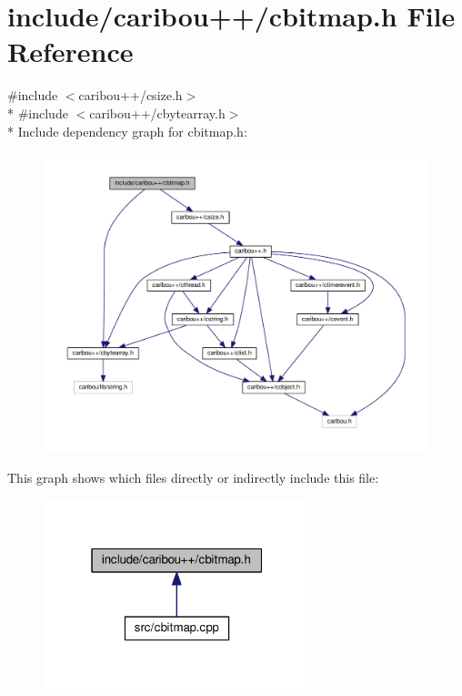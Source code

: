 \section{include/caribou++/cbitmap.h File Reference}
\label{cbitmap_8h}
{\ttfamily \#include $<$caribou++/csize.\-h$>$}\\*
{\ttfamily \#include $<$caribou++/cbytearray.\-h$>$}\\*
Include dependency graph for cbitmap.\-h\-:\nopagebreak
\begin{figure}[H]
\begin{center}
\leavevmode
\includegraphics[width=350pt]{cbitmap_8h__incl}
\end{center}
\end{figure}
This graph shows which files directly or indirectly include this file\-:\nopagebreak
\begin{figure}[H]
\begin{center}
\leavevmode
\includegraphics[width=220pt]{cbitmap_8h__dep__incl}
\end{center}
\end{figure}

